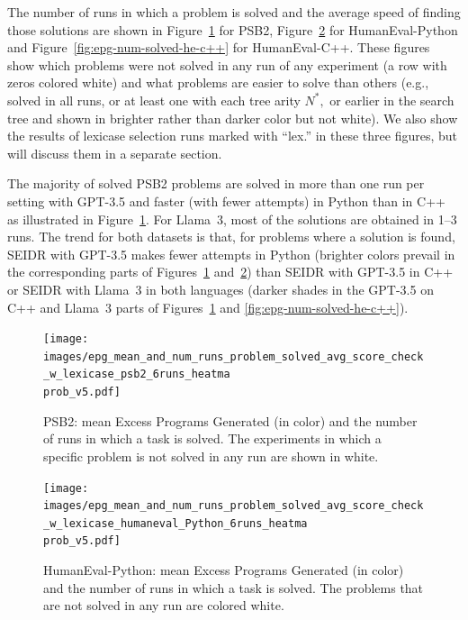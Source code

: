 The number of runs in which a problem is solved and the average speed of finding those solutions are shown in Figure~\ref{fig:epg-num-solved-psb2} for PSB2, Figure~\ref{fig:epg-num-solved-he-python}
for HumanEval-Python and Figure~\ref{fig:epg-num-solved-he-c++} for HumanEval-C++.
These figures show which problems were not solved in any run of any experiment (a row with zeros colored white) and what problems are easier to solve than others (e.g., solved in all runs, or at least one with each tree arity $N^*,$ or earlier in the search tree and shown in brighter rather than darker color but not white). 
We also show the results of lexicase selection runs marked with ``lex.'' in these three figures, but will discuss them in a separate section. 

The majority of solved PSB2 problems are solved in more than one run per setting with GPT-3.5 and faster (with fewer attempts) in Python than in C++ as illustrated in Figure~\ref{fig:epg-num-solved-psb2}.
For Llama~3, most of the solutions are obtained in 1--3 runs.
The trend for both datasets is that, for problems where a solution is found, SEIDR with GPT-3.5 makes fewer attempts in Python (brighter colors prevail in the corresponding parts of Figures~\ref{fig:epg-num-solved-psb2} and~\ref{fig:epg-num-solved-he-python}) than SEIDR with GPT-3.5 in C++ or SEIDR with Llama~3 in both languages (darker shades in the GPT-3.5 on C++ and Llama~3 parts of Figures~\ref{fig:epg-num-solved-psb2} and \ref{fig:epg-num-solved-he-c++}).


\begin{figure}
  \centering
  \texttt{[image: images/epg\_mean\_and\_num\_runs\_problem\_solved\_avg\_score\_check\_w\_lexicase\_psb2\_6runs\_heatma\\prob\_v5.pdf]}
  \caption{PSB2: mean Excess Programs Generated (in color) and the number of runs in which a task is solved. The experiments in which a specific problem is not solved in any run are shown in white.}
  \label{fig:epg-num-solved-psb2}
\end{figure}

\begin{figure}[hbt!]
  \centering
  \texttt{[image: images/epg\_mean\_and\_num\_runs\_problem\_solved\_avg\_score\_check\_w\_lexicase\_humaneval\_Python\_6runs\_heatma\\prob\_v5.pdf]}
  \vspace{-4pt}
  \caption{HumanEval-Python: mean Excess Programs Generated (in color) and the number of runs in which a task is solved. The problems that are not solved in any run are colored white.}
  \label{fig:epg-num-solved-he-python}
  \vspace{-12pt}
\end{figure}

